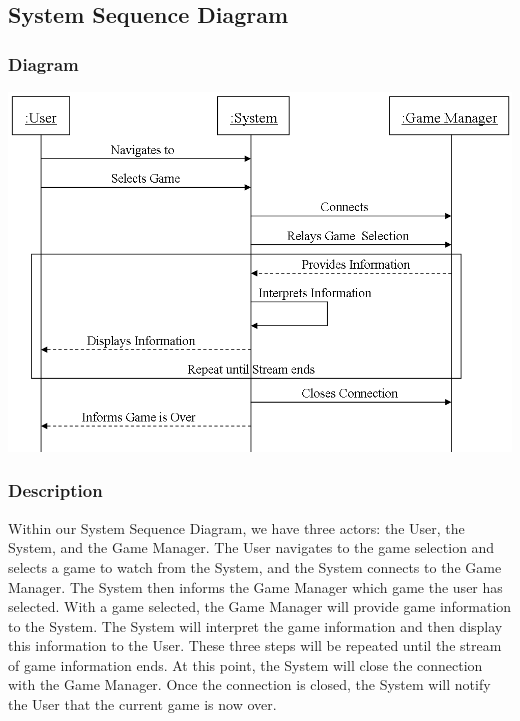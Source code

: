 %

	\subsection{System Sequence Diagram}
	
		\subsubsection{Diagram}
			\includegraphics[width=1.0\textwidth]{./SSD_of_Watch_Live.png}
			
		\subsubsection{Description}
			Within our System Sequence Diagram, we have three actors: the User, the System, and the Game Manager. The User navigates to the game selection and selects a game to watch from the System, and the System connects to the Game Manager. The System then informs the Game Manager which game the user has selected. With a game selected, the Game Manager will provide game information to the System. The System will interpret the game information and then display this information to the User. These three steps will be repeated until the stream of game information ends. At this point, the System will close the connection with the Game Manager. Once the connection is closed, the System will notify the User that the current game is now over.
